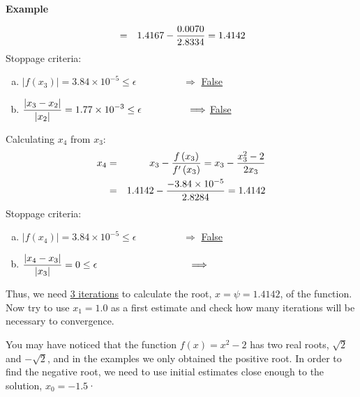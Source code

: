 \begin{MyExample}{\begin{center}{\bf Example}\end{center}}
\begin{list}{{\bf Iteration } (k=):~}{}
\begin{eqnarray}
                           &=& 1.4167 - \displaystyle\frac{0.0070}{2.8334} = 1.4142\nonumber
                  \end{eqnarray}
                  Stoppage criteria:
                    \begin{enumerate}[(a)]
                         \item $\left|f\left(x_{3}\right)\right| = 3.84\times 10^{-5} \leq \epsilon \hspace{2cm} \Longrightarrow$ \underline{False}
                         \item $\displaystyle\frac{\left|x_{3}-x_{2}\right|}{\left|x_{2}\right|} = 1.77\times 10^{-3} \leq \epsilon \hspace{1.65cm} \Longrightarrow$ \underline{False}
                    \end{enumerate}
            \item Calculating $x_{4}$ from $x_{3}$:
                  \begin{eqnarray}
                      x_{4} &=& x_{3} - \displaystyle\frac{f\left(x_{3}\right)}{f'\left(x_{3}\right)} = x_{3} - \displaystyle\frac{ x_{3}^{2}-2 }{ 2x_{3}} \nonumber \\
                           &=& 1.4142 - \displaystyle\frac{-3.84\times 10^{-5}}{2.8284} = 1.4142\nonumber
                  \end{eqnarray}
                  Stoppage criteria:
                    \begin{enumerate}[(a)]
                         \item $\left|f\left(x_{4}\right)\right| = 3.84\times 10^{-5} \leq \epsilon \hspace{2cm} \Longrightarrow$ \underline{False}
                         \item $\frc{\left|x_{4}-x_{3}\right|}{\left|x_{3}\right|} = 0 \leq \epsilon \hspace{3.3cm} \Longrightarrow$ 
                    \end{enumerate}
         \end{list}
         Thus, we need \underline{3 iterations} to calculate the root, \underline{$x=\psi=1.4142$}, of the function. Now try to use $x_{1}=1.0$ as a first estimate and check how many iterations will be necessary to convergence.

    You may have noticed that the function $f(x)=x^{2}-2$ has two real roots, $\sqrt{2}$ and $-\sqrt{2}$, and in the examples we only obtained the positive root. In order to find the negative root, we need to use initial estimates close enough to the solution, \eg $x_{0}=-1.5$·
   \end{MyExample}
